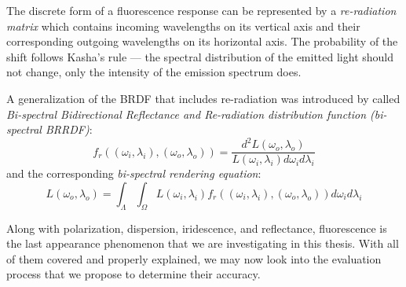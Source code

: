 The discrete form of a fluorescence response can be represented by a \emph{re-radiation matrix} which contains incoming wavelengths on its vertical axis and their corresponding outgoing wavelengths on its horizontal axis. The probability of the shift follows Kasha's rule --- the spectral distribution of the emitted light should not change, only the intensity of the emission spectrum does.

A generalization of the BRDF that includes re-radiation was introduced by \citet{hullin2010acquisition} called \emph{Bi-spectral Bidirectional Reflectance and Re-radiation distribution function (bi-spectral BRRDF)}:
\begin{equation}
f_r((\omega_i,\lambda_i),(\omega_o,\lambda_o))=\frac{d^2L(\omega_o,\lambda_o)}{L(\omega_i,\lambda_i)d\omega_i d\lambda_i}
\end{equation}
and the corresponding \emph{bi-spectral rendering equation}:
\begin{equation}
L(\omega_o,\lambda_o)=\int_{\Lambda}\int_{\Omega}L(\omega_i,\lambda_i)f_r((\omega_i,\lambda_i),(\omega_o,\lambda_o))d\omega_i d\lambda_i
\end{equation}

Along with polarization, dispersion, iridescence, and reflectance, fluorescence is the last appearance phenomenon that we are investigating in this thesis. With all of them covered and properly explained, we may now look into the evaluation process that we propose to determine their accuracy.
